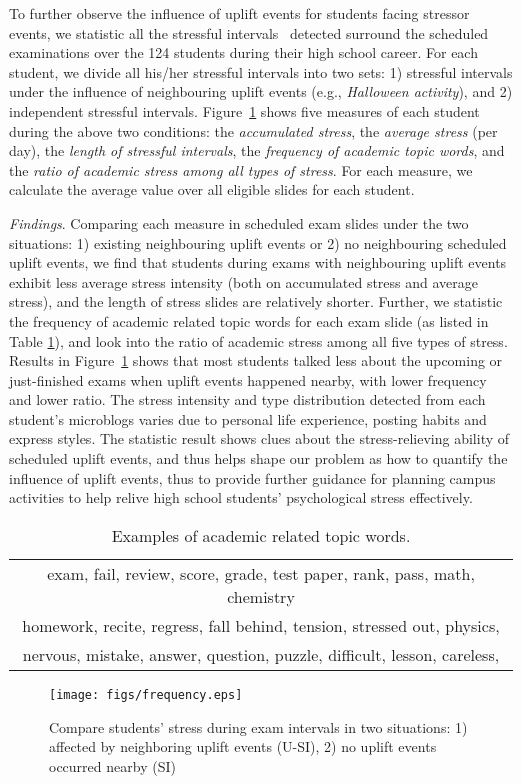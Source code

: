 To further observe the influence of uplift events for students facing stressor events,
we statistic all the stressful intervals~\cite{Li2017Analyzing} detected surround the scheduled examinations over the 124 students during their high school career.
For each student, we divide all his/her stressful intervals into two sets:
1) stressful intervals under the influence of neighbouring uplift events (e.g., \emph{Halloween activity}), and 2) independent stressful intervals.
Figure~\ref{fig:frequency} shows five measures of each student during the above two conditions:
the \emph{accumulated stress}, the \emph{average stress} (per day), the \emph{length of stressful intervals},
the \emph{frequency of academic topic words}, and the \emph{ratio of academic stress among all types of stress}.
For each measure, we calculate the average value over all eligible slides for each student.

\emph{Findings}. Comparing each measure in scheduled exam slides under the two situations: 1) existing neighbouring uplift events or 2) no neighbouring scheduled uplift events,
we find that students during exams with neighbouring uplift events exhibit less average stress intensity (both on accumulated stress and average stress),
and the length of stress slides are relatively shorter.
Further, we statistic the frequency of academic related topic words for each exam slide (as listed in Table \ref{tab:studyWords}),
and look into the ratio of academic stress among all five types of stress.
Results in Figure~\ref{fig:frequency} shows that most students talked less about the upcoming or just-finished exams when uplift events happened nearby,
with lower frequency and lower ratio.
The stress intensity and type distribution detected from each student's microblogs varies due to personal life experience, posting habits and express styles.
The statistic result shows clues about the stress-relieving ability of scheduled uplift events,
and thus helps shape our problem as how to quantify the influence of uplift events,
thus to provide further guidance for planning campus activities to help relive high school students' psychological stress effectively.

\begin{table}[h]
\centering
\caption{Examples of academic related topic words.}
\label{tab:studyWords}
\begin{tabular}{c}
\toprule
exam, fail, review, score, grade, test paper, rank, pass, math, chemistry\\
homework, recite, regress, fall behind, tension, stressed out, physics,\\
nervous, mistake, answer, question, puzzle, difficult, lesson, careless, \\
\bottomrule
\end{tabular}
\end{table}


\begin{figure}
\centering
\caption{Compare students' stress during exam intervals in two situations:
1) affected by neighboring uplift events (U-SI), 2) no uplift events occurred nearby (SI)}
\texttt{[image: figs/frequency.eps]}
\label{fig:frequency}
\end{figure}

